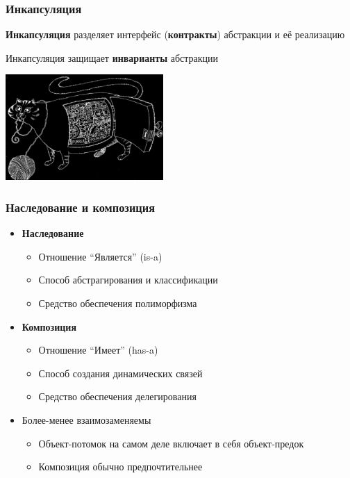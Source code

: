 \documentclass{../cscslides}
\begin{document}
    \begin{frame}
        \frametitle{Инкапсуляция}
        \textbf{Инкапсуляция} разделяет интерфейс (\textbf{контракты}) абстракции и её реализацию

        Инкапсуляция защищает \textbf{инварианты} абстракции
        \vskip 1cm
        \begin{center}
            \includegraphics[width=0.45\textwidth]{incapsulationBlack.png}
        \end{center}
    \end{frame}

    \begin{frame}
        \frametitle{Наследование и композиция}
        \begin{itemize}
            \item \textbf{Наследование}
            \begin{itemize}
                \item Отношение ``Является'' (is-a)
                \item Способ абстрагирования и классификации
                \item Средство обеспечения полиморфизма
            \end{itemize}
            \item \textbf{Композиция}
            \begin{itemize}
                \item Отношение ``Имеет'' (has-a)
                \item Способ создания динамических связей
                \item Средство обеспечения делегирования
            \end{itemize}
            \item Более-менее взаимозаменяемы
            \begin{itemize}
                \item Объект-потомок на самом деле включает в себя объект-предок
                \item Композиция обычно предпочтительнее
            \end{itemize}
        \end{itemize}
    \end{frame}
\end{document}

